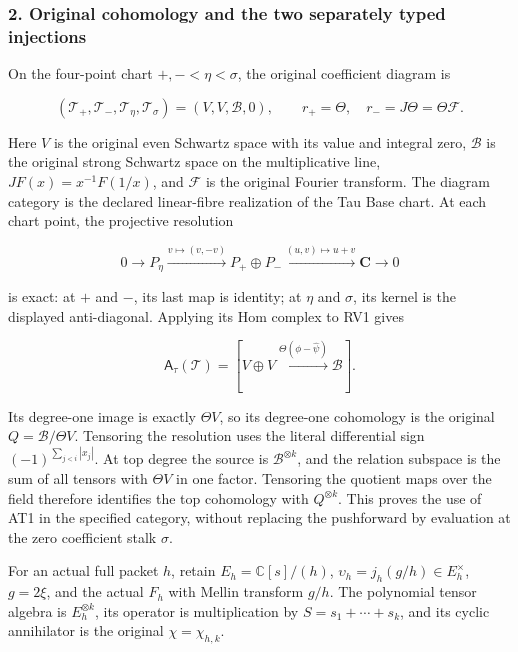 \subsubsection{2. Original cohomology and the two separately typed injections}\label{endpoint-determinant_review--original-cohomology-and-the-two-separately-typed-injections}

On the four-point chart \(+,-<\eta<\sigma\), the original coefficient diagram is

\[
(\mathcal T_+,\mathcal T_-,\mathcal T_\eta,\mathcal T_\sigma)
=(V,V,\mathscr B,0),\qquad
r_+=\Theta,\quad r_-=J\Theta=\Theta\mathcal F.
\tag{RV1}
\]

Here \(V\) is the original even Schwartz space with its value and integral zero, \(\mathscr B\) is the original strong Schwartz space on the multiplicative line, \(JF(x)=x^{-1}F(1/x)\), and \(\mathcal F\) is the original Fourier transform. The diagram category is the declared linear-fibre realization of the Tau Base chart. At each chart point, the projective resolution

\[
0\to P_\eta\xrightarrow{v\mapsto(v,-v)}
P_+\oplus P_-\xrightarrow{(u,v)\mapsto u+v}\mathbf C\to0
\tag{RV2}
\]

is exact: at \(+\) and \(-\), its last map is identity; at \(\eta\) and \(\sigma\), its kernel is the displayed anti-diagonal. Applying its Hom complex to RV1 gives

\[
\mathsf A_\tau(\mathcal T)
=[V\oplus V\xrightarrow{\Theta(\phi-\widehat\psi)}\mathscr B].
\tag{RV3}
\]

Its degree-one image is exactly \(\Theta V\), so its degree-one cohomology is the original \(Q=\mathscr B/\Theta V\). Tensoring the resolution uses the literal differential sign \((-1)^{\sum_{j<i}|x_j|}\). At top degree the source is \(\mathscr B^{\otimes k}\), and the relation subspace is the sum of all tensors with \(\Theta V\) in one factor. Tensoring the quotient maps over the field therefore identifies the top cohomology with \(Q^{\otimes k}\). This proves the use of AT1 in the specified category, without replacing the pushforward by evaluation at the zero coefficient stalk \(\sigma\).

For an actual full packet \(h\), retain \(E_h=\mathbb C[s]/(h)\), \(\upsilon_h=j_h(g/h)\in E_h^\times\), \(g=2\xi\), and the actual \(F_h\) with Mellin transform \(g/h\). The polynomial tensor algebra is \(E_h^{\otimes k}\), its operator is multiplication by \(S=s_1+\cdots+s_k\), and its cyclic annihilator is the original \(\chi=\chi_{h,k}\).

